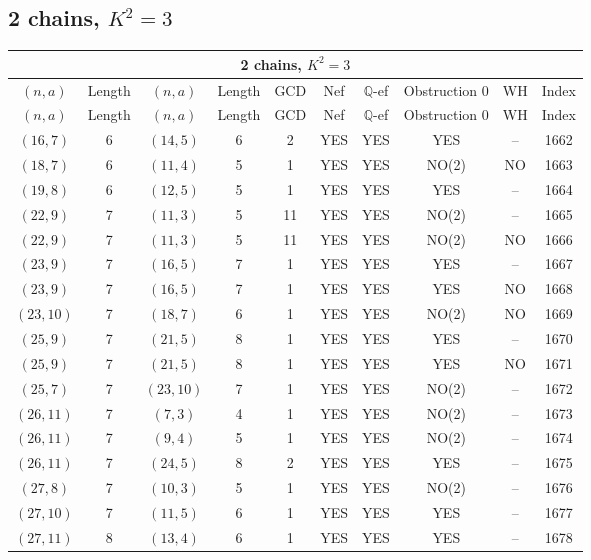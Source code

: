 \subsection{2 chains, $K^2 = 3$}
\begin{longtable}{|c|c|c|c|c|c|c|c|c|c|}
\hline
\multicolumn{10}{|c|}{2 chains, $K^2 = 3$}\\
\hline
$(n,a)$ & Length & $(n,a)$ & Length & GCD & Nef & $\mathbb Q$-ef & Obstruction 0 & WH & Index\\
\hline
\endfirsthead

\hline
$(n,a)$ & Length & $(n,a)$ & Length & GCD & Nef & $\mathbb Q$-ef & Obstruction 0 & WH & Index\\
\hline
\endhead
\hline
\endfoot

$(16, 7)$ & 6 & $(14, 5)$ & 6 & 2 & YES & YES & YES & -- & 1662\\
$(18, 7)$ & 6 & $(11, 4)$ & 5 & 1 & YES & YES & NO(2) & NO & 1663\\
$(19, 8)$ & 6 & $(12, 5)$ & 5 & 1 & YES & YES & YES & -- & 1664\\
$(22, 9)$ & 7 & $(11, 3)$ & 5 & 11 & YES & YES & NO(2) & -- & 1665\\
$(22, 9)$ & 7 & $(11, 3)$ & 5 & 11 & YES & YES & NO(2) & NO & 1666\\
$(23, 9)$ & 7 & $(16, 5)$ & 7 & 1 & YES & YES & YES & -- & 1667\\
$(23, 9)$ & 7 & $(16, 5)$ & 7 & 1 & YES & YES & YES & NO & 1668\\
$(23, 10)$ & 7 & $(18, 7)$ & 6 & 1 & YES & YES & NO(2) & NO & 1669\\
$(25, 9)$ & 7 & $(21, 5)$ & 8 & 1 & YES & YES & YES & -- & 1670\\
$(25, 9)$ & 7 & $(21, 5)$ & 8 & 1 & YES & YES & YES & NO & 1671\\
$(25, 7)$ & 7 & $(23, 10)$ & 7 & 1 & YES & YES & NO(2) & -- & 1672\\
$(26, 11)$ & 7 & $(7, 3)$ & 4 & 1 & YES & YES & NO(2) & -- & 1673\\
$(26, 11)$ & 7 & $(9, 4)$ & 5 & 1 & YES & YES & NO(2) & -- & 1674\\
$(26, 11)$ & 7 & $(24, 5)$ & 8 & 2 & YES & YES & YES & -- & 1675\\
$(27, 8)$ & 7 & $(10, 3)$ & 5 & 1 & YES & YES & NO(2) & -- & 1676\\
$(27, 10)$ & 7 & $(11, 5)$ & 6 & 1 & YES & YES & YES & -- & 1677\\
$(27, 11)$ & 8 & $(13, 4)$ & 6 & 1 & YES & YES & YES & -- & 1678\\

\end{longtable}
